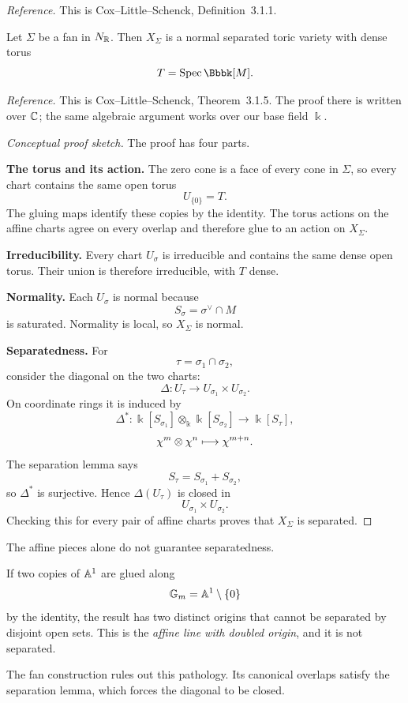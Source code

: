 \noindent
\textit{Reference.}
This is Cox--Little--Schenck, Definition~3.1.1.

\begin{theorem}
\label{thm:toric-variety-of-fan}
Let \(\Sigma\) be a fan in \(N_{\mathbb{R}}\). Then \(X_\Sigma\) is a normal
separated toric variety with dense torus
\[
T=\Spec\Bbbk[M].
\]
\end{theorem}

\noindent
\textit{Reference.}
This is Cox--Little--Schenck, Theorem~3.1.5. The proof there is written
over \(\mathbb{C}\); the same algebraic argument works over our base field
\(\Bbbk\).

\begin{proof}[Conceptual proof sketch]
The proof has four parts.

\smallskip

\noindent
\textbf{The torus and its action.}
The zero cone is a face of every cone in \(\Sigma\), so every chart
contains the same open torus
\[
U_{\{0\}}=T.
\]
The gluing maps identify these copies by the identity. The torus
actions on the affine charts agree on every overlap and therefore glue
to an action on \(X_\Sigma\).

\smallskip

\noindent
\textbf{Irreducibility.}
Every chart \(U_\sigma\) is irreducible and contains the same dense
open torus. Their union is therefore irreducible, with \(T\) dense.

\smallskip

\noindent
\textbf{Normality.}
Each \(U_\sigma\) is normal because
\[
S_\sigma=\sigma^\vee\cap M
\]
is saturated. Normality is local, so \(X_\Sigma\) is normal.

\smallskip

\noindent
\textbf{Separatedness.}
For
\[
\tau=\sigma_1\cap\sigma_2,
\]
consider the diagonal on the two charts:
\[
\Delta:
U_\tau
\longrightarrow
U_{\sigma_1}\times U_{\sigma_2}.
\]
On coordinate rings it is induced by
\[
\Delta^*:
\Bbbk[S_{\sigma_1}]
\otimes_\Bbbk
\Bbbk[S_{\sigma_2}]
\longrightarrow
\Bbbk[S_\tau],
\]
\[
\chi^{m}\otimes\chi^{n}
\longmapsto
\chi^{m+n}.
\]
The separation lemma says
\[
S_\tau=S_{\sigma_1}+S_{\sigma_2},
\]
so \(\Delta^*\) is surjective. Hence \(\Delta(U_\tau)\) is closed in
\[
U_{\sigma_1}\times U_{\sigma_2}.
\]
Checking this for every pair of affine charts proves that
\(X_\Sigma\) is separated.
\end{proof}

\begin{warningbox}
The affine pieces alone do not guarantee separatedness.

If two copies of \(\mathbb{A}^1\) are glued along
\[
\mathbb{G}_{m}=\mathbb{A}^1\setminus\{0\}
\]
by the identity, the result has two distinct origins that cannot be
separated by disjoint open sets. This is the \emph{affine line with
doubled origin}, and it is not separated.

The fan construction rules out this pathology. Its canonical
overlaps satisfy the separation lemma, which forces the diagonal to
be closed.
\end{warningbox}


